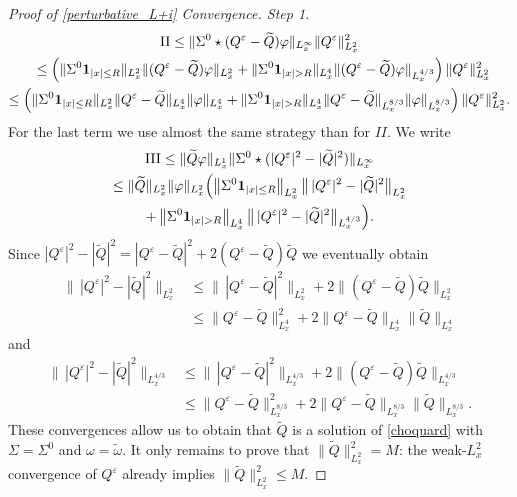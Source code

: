 \documentclass[10pt]{amsart}
\theoremstyle{definition}
\newenvironment{ProofOf}[1]{\begin{proof}[Proof of #1]}{\end{proof}}
\begin{document}
\begin{ProofOf}{\eqref{perturbative_L+i} Convergence. Step 1}
\bgroup
{}
\begin{multline*}
\textup{II}\leq\|\Sigma^{0}\star(Q^{\varepsilon}-\widetilde{Q})\varphi\|_{L_{x}^{\infty}}\|Q^{\varepsilon}\|_{L_{x}^{2}}^{2}\\
\shoveleft{\hphantom{\textup{II}}\leq\left(\|\Sigma^{0}\mathbf{1}_{|x|\leq R}\|_{L_{x}^{2}}\|(Q^{\varepsilon}-\widetilde{Q})\varphi\|_{L_{x}^{2}}+\|\Sigma^{0}\mathbf{1}_{|x|>R}\|_{L_{x}^{4}}\|(Q^{\varepsilon}-\widetilde{Q})\varphi\|_{L_{x}^{4/3}}\right)\|Q^{\varepsilon}\|_{L_{x}^{2}}^{2}}\\
\leq\left(\|\Sigma^{0}\mathbf{1}_{|x|\leq R}\|_{L_{x}^{2}}\|Q^{\varepsilon}-\widetilde{Q}\|_{L_{x}^{4}}\|\varphi\|_{L_{x}^{4}}+\|\Sigma^{0}\mathbf{1}_{|x|>R}\|_{L_{x}^{4}}\|Q^{\varepsilon}-\widetilde{Q}\|_{L_{x}^{8/3}}\|\varphi\|_{L_{x}^{8/3}}\right)\|Q^{\varepsilon}\|_{L_{x}^{2}}^{2}.
\end{multline*}
\egroup
For the last term we use almost the same strategy than for $II$. We write
\begin{multline*}
\textup{III}\leq\|\widetilde{Q}\varphi\|_{L_{x}^{1}}\|\Sigma^{0}\star(|Q^{\varepsilon}|^{2}-|\widetilde{Q}|^{2})\|_{L_{x}^{\infty}}\\
\leq\|\widetilde{Q}\|_{L_{x}^{2}}\|\varphi\|_{L_{x}^{2}}\Bigl(\left\|\Sigma^{0}\mathbf{1}_{|x|\leq R}\right\|_{L_{x}^{2}}\bigl\|\,|Q^{\varepsilon}|^{2}-|\widetilde{Q}|^{2}\bigr\|_{L_{x}^{2}}\\
+\left\|\Sigma^{0}\mathbf{1}_{|x|>R}\right\|_{L_{x}^{4}}\bigl\|\,|Q^{\varepsilon}|^{2}-|\widetilde{Q}|^{2}\bigr\|_{L_{x}^{4/3}}\Bigr).
\end{multline*}
Since $|Q^{\varepsilon}|^{2}-|\widetilde{Q}|^{2}=|Q^{\varepsilon}-\widetilde{Q}|^{2}+2(Q^{\varepsilon}-\widetilde{Q})\widetilde{Q}$ we eventually obtain
\begin{align*}
\bigl\|\,|Q^{\varepsilon}|^{2}-|\widetilde{Q}|^{2}\bigr\|_{L_{x}^{2}}&\leq\bigl\|\,|Q^{\varepsilon}-\widetilde{Q}|^{2}\bigr\|_{L_{x}^{2}}+2\bigl\|(Q^{\varepsilon}-\widetilde{Q})\widetilde{Q}\bigr\|_{L_{x}^{2}}\\
&\leq\bigl\|Q^{\varepsilon}-\widetilde{Q}\bigr\|_{L_{x}^{4}}^{2}+2\bigl\|Q^{\varepsilon}-\widetilde{Q}\bigr\|_{L_{x}^{4}}\bigl\|\widetilde{Q}\bigr\|_{L_{x}^{4}}
\end{align*}
and
\begin{align*}
\bigl\|\,|Q^{\varepsilon}|^{2}-|\widetilde{Q}|^{2}\bigr\|_{L_{x}^{4/3}}&\leq\bigl\|\,|Q^{\varepsilon}-\widetilde{Q}|^{2}\bigr\|_{L_{x}^{4/3}}+2\bigl\|(Q^{\varepsilon}-\widetilde{Q})\widetilde{Q}\bigr\|_{L_{x}^{4/3}}\\
&\leq\bigl\|Q^{\varepsilon}-\widetilde{Q}\bigr\|_{L_{x}^{8/3}}^{2}+2\bigl\|Q^{\varepsilon}-\widetilde{Q}\bigr\|_{L_{x}^{8/3}}\bigl\|\widetilde{Q}\bigr\|_{L_{x}^{8/3}}.
\end{align*}
These convergences allow us to obtain that $\widetilde{Q}$ is a solution of \eqref{choquard} with $\Sigma=\Sigma^{0}$ and $\omega=\widetilde{\omega}$. It only remains to prove that $\|\widetilde{Q}\|_{L_{x}^{2}}^{2}=M$: the weak-$L_{x}^{2}$ convergence of $Q^{\varepsilon}$ already implies $\|\widetilde{Q}\|_{L_{x}^{2}}^{2}\leq M$.


\end{ProofOf}
\end{document}
